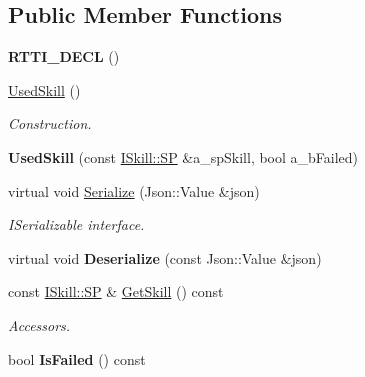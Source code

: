 \subsection*{Public Member Functions}
\begin{DoxyCompactItemize}
\item 
\mbox{\label{class_used_skill_a83be394652687321497faa1958bbd951}} 
{\bfseries R\+T\+T\+I\+\_\+\+D\+E\+CL} ()
\item 
\mbox{\label{class_used_skill_ae082664c88d1b7576da997629c6820f5}} 
\hyperlink{class_used_skill_ae082664c88d1b7576da997629c6820f5}{Used\+Skill} ()
\begin{DoxyCompactList}\small\item\em Construction. \end{DoxyCompactList}\item 
\mbox{\label{class_used_skill_a43e47ab501956f70e2276dad62f396dd}} 
{\bfseries Used\+Skill} (const \hyperlink{class_i_skill_a68bcce999ab0444eebaca3fb8ddb8a31}{I\+Skill\+::\+SP} \&a\+\_\+sp\+Skill, bool a\+\_\+b\+Failed)
\item 
\mbox{\label{class_used_skill_a25a5493ba651a760537a4a62d4ffcf0c}} 
virtual void \hyperlink{class_used_skill_a25a5493ba651a760537a4a62d4ffcf0c}{Serialize} (Json\+::\+Value \&json)
\begin{DoxyCompactList}\small\item\em I\+Serializable interface. \end{DoxyCompactList}\item 
\mbox{\label{class_used_skill_a394a26c66d269d043a88e589bfb2162e}} 
virtual void {\bfseries Deserialize} (const Json\+::\+Value \&json)
\item 
\mbox{\label{class_used_skill_a7c6f40cd5da674b362f8210126274801}} 
const \hyperlink{class_i_skill_a68bcce999ab0444eebaca3fb8ddb8a31}{I\+Skill\+::\+SP} \& \hyperlink{class_used_skill_a7c6f40cd5da674b362f8210126274801}{Get\+Skill} () const
\begin{DoxyCompactList}\small\item\em Accessors. \end{DoxyCompactList}\item 
\mbox{\label{class_used_skill_a6a45e4916a991f7eb38aa08c9a7d3fbf}} 
bool {\bfseries Is\+Failed} () const
\end{DoxyCompactItemize}
